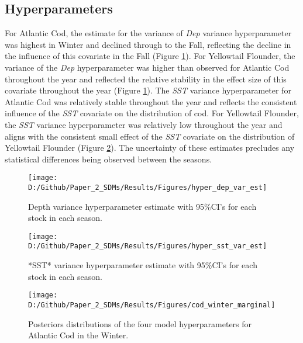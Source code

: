 \documentclass[
]{article}
\begin{document}
\hypertarget{hyperparameters}{%
\subsection{Hyperparameters}\label{hyperparameters}}

For Atlantic Cod, the estimate for the variance of \emph{Dep} variance hyperparameter was highest in Winter and declined through to the Fall, reflecting the decline in the influence of this covariate in the Fall (Figure \ref{fig:hyper-dep-var-est}). For Yellowtail Flounder, the variance of the \emph{Dep} hyperparameter was higher than observed for Atlantic Cod throughout the year and reflected the relative stability in the effect size of this covariate throughout the year (Figure \ref{fig:hyper-dep-var-est}). The \emph{SST} variance hyperparameter for Atlantic Cod was relatively stable throughout the year and reflects the consistent influence of the \emph{SST} covariate on the distribution of cod. For Yellowtail Flounder, the \emph{SST} variance hyperparameter was relatively low throughout the year and aligns with the consistent small effect of the \emph{SST} covariate on the distribution of Yellowtail Flounder (Figure \ref{fig:hyper-sst-var-est}). The uncertainty of these estimates precludes any statistical differences being observed between the seasons.

\begin{figure}
\texttt{[image: D:/Github/Paper\_2\_SDMs/Results/Figures/hyper\_dep\_var\_est]} \caption{Depth variance hyperparameter estimate with 95\%CI's for each stock in each season.}\label{fig:hyper-dep-var-est}
\end{figure}

\clearpage

\begin{figure}
\texttt{[image: D:/Github/Paper\_2\_SDMs/Results/Figures/hyper\_sst\_var\_est]} \caption{*SST* variance hyperparameter estimate with 95\%CI's for each stock in each season.}\label{fig:hyper-sst-var-est}
\end{figure}

\clearpage

\begin{figure}
\texttt{[image: D:/Github/Paper\_2\_SDMs/Results/Figures/cod\_winter\_marginal]} \caption{Posteriors distributions of the four model hyperparameters for Atlantic Cod in the Winter.}\label{fig:hyper-cod-winter-post}
\end{figure}
\end{document}
